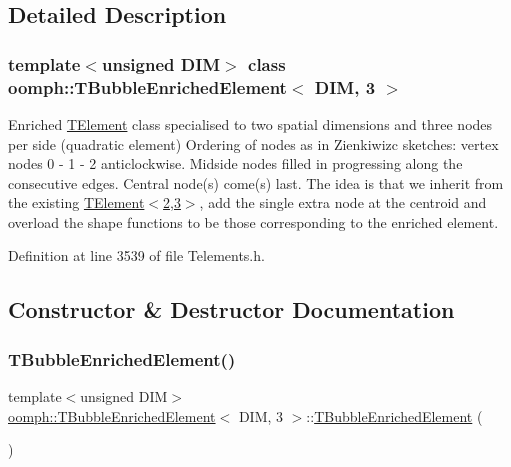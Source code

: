 \subsection{Detailed Description}
\subsubsection*{template$<$unsigned D\+IM$>$\newline
class oomph\+::\+T\+Bubble\+Enriched\+Element$<$ D\+I\+M, 3 $>$}

Enriched \hyperlink{classoomph_1_1TElement}{T\+Element} class specialised to two spatial dimensions and three nodes per side (quadratic element) Ordering of nodes as in Zienkiwizc sketches\+: vertex nodes 0 -\/ 1 -\/ 2 anticlockwise. Midside nodes filled in progressing along the consecutive edges. Central node(s) come(s) last. The idea is that we inherit from the existing \hyperlink{classoomph_1_1TElement}{T\+Element$<$2,3$>$}, add the single extra node at the centroid and overload the shape functions to be those corresponding to the enriched element. 

Definition at line 3539 of file Telements.\+h.



\subsection{Constructor \& Destructor Documentation}
\mbox{\label{classoomph_1_1TBubbleEnrichedElement_3_01DIM_00_013_01_4_ad7b4bb73defa6c522acf3f08c4b73027}} 
\subsubsection{\texorpdfstring{T\+Bubble\+Enriched\+Element()}{TBubbleEnrichedElement()}\hspace{0.1cm}{\footnotesize\ttfamily [1/2]}}
{\footnotesize\ttfamily template$<$unsigned D\+IM$>$ \\
\hyperlink{classoomph_1_1TBubbleEnrichedElement}{oomph\+::\+T\+Bubble\+Enriched\+Element}$<$ D\+IM, 3 $>$\+::\hyperlink{classoomph_1_1TBubbleEnrichedElement}{T\+Bubble\+Enriched\+Element} (\begin{DoxyParamCaption}{ }\end{DoxyParamCaption})\hspace{0.3cm}{\ttfamily [inline]}}



